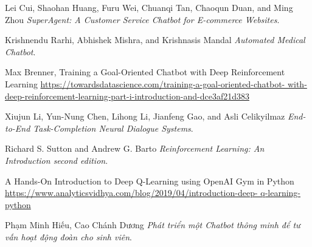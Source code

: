 \begin{thebibliography}{99}
\raggedright
Lei Cui, Shaohan Huang, Furu Wei, Chuanqi Tan, Chaoqun Duan, and Ming Zhou
\textit{SuperAgent: A Customer Service Chatbot for E-commerce Websites}.

Krishnendu Rarhi, Abhishek Mishra, and Krishnasis Mandal
\textit{Automated Medical Chatbot}.

Max Brenner, Training a Goal-Oriented Chatbot with Deep Reinforcement
Learning
\url{https://towardsdatascience.com/training-a-goal-oriented-chatbot-
with-deep-reinforcement-learning-part-i-introduction-and-dce3af21d383}

Xiujun Li, Yun-Nung Chen, Lihong Li, Jianfeng Gao, and Asli Celikyilmaz
\textit{End-to-End Task-Completion Neural Dialogue Systems}.

Richard S. Sutton and Andrew G. Barto
\textit{Reinforcement Learning: An Introduction second edition}.

A Hands-On Introduction to Deep Q-Learning using OpenAI Gym in Python
\url{https://www.analyticsvidhya.com/blog/2019/04/introduction-deep-
q-learning-python}

Phạm Minh Hiếu, Cao Chánh Dương
\textit{Phát triển một Chatbot thông minh để tư vấn hoạt động đoàn
cho sinh viên}.

\end{thebibliography}
